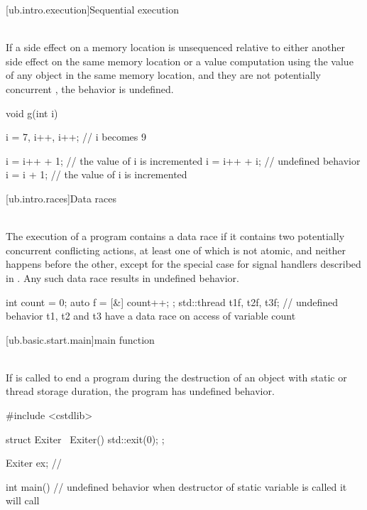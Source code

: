 [ub.intro.execution]{Sequential execution}

\pnum
{} \\
If a side effect on a
memory location  is unsequenced relative to either another side effect on the same memory location or
a value computation using the value of any object in the same memory location, and they are not potentially
concurrent , the behavior is undefined.

\pnum
\begin{example}
\begin{codeblock}
void g(int i) {
  i = 7, i++, i++;  // i becomes 9

  i = i++ + 1;  // the value of i is incremented
  i = i++ + i;  // undefined behavior
  i = i + 1;    // the value of i is incremented
}
\end{codeblock}
\end{example}

[ub.intro.races]{Data races}

\pnum
{} \\
The execution of a program contains a data race if it contains two potentially concurrent conflicting actions,
at least one of which is not atomic, and neither happens before the other, except for the special case for
signal handlers described in . Any such data race results in undefined behavior.

\pnum
\begin{example}
\begin{codeblock}
int count = 0;
auto f = [&] { count++; };
std::thread t1{f}, t2{f}, t3{f};
// undefined behavior t1, t2 and t3 have a data race on access of variable count
\end{codeblock}
\end{example}


[ub.basic.start.main]{main function}

\pnum
{} \\
If  is called to
end a program during the destruction of an object with static or thread storage duration, the program has
undefined behavior.

\pnum
\begin{example}
\begin{codeblock}
#include <cstdlib>

struct Exiter {
  ~Exiter() { std::exit(0); }
};

Exiter ex;  //

int main() {}
// undefined behavior when destructor of static variable  is called it will call 
\end{codeblock}
\end{example}


